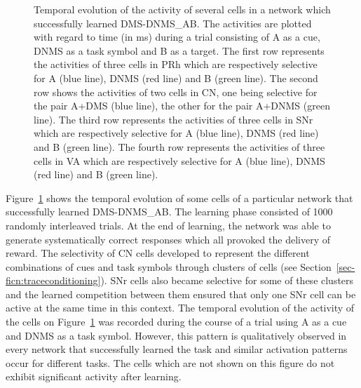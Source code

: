 \documentclass[
  11pt,
  a4paper,
]{scrbook}
\begin{document}
\begin{figure}


\caption{\label{fig-ficn:timecourse}Temporal evolution of the activity
of several cells in a network which successfully learned DMS-DNMS\_AB.
The activities are plotted with regard to time (in ms) during a trial
consisting of A as a cue, DNMS as a task symbol and B as a target. The
first row represents the activities of three cells in PRh which are
respectively selective for A (blue line), DNMS (red line) and B (green
line). The second row shows the activities of two cells in CN, one being
selective for the pair A+DMS (blue line), the other for the pair A+DNMS
(green line). The third row represents the activities of three cells in
SNr which are respectively selective for A (blue line), DNMS (red line)
and B (green line). The fourth row represents the activities of three
cells in VA which are respectively selective for A (blue line), DNMS
(red line) and B (green line).}

\end{figure}%

Figure~\ref{fig-ficn:timecourse} shows the temporal evolution of some
cells of a particular network that successfully learned DMS-DNMS\_AB.
The learning phase consisted of 1000 randomly interleaved trials. At the
end of learning, the network was able to generate systematically correct
responses which all provoked the delivery of reward. The selectivity of
CN cells developed to represent the different combinations of cues and
task symbols through clusters of cells (see
Section~\ref{sec-ficn:traceconditioning}). SNr cells also became
selective for some of these clusters and the learned competition between
them ensured that only one SNr cell can be active at the same time in
this context. The temporal evolution of the activity of the cells on
Figure~\ref{fig-ficn:timecourse} was recorded during the course of a
trial using A as a cue and DNMS as a task symbol. However, this pattern
is qualitatively observed in every network that successfully learned the
task and similar activation patterns occur for different tasks. The
cells which are not shown on this figure do not exhibit significant
activity after learning.
\end{document}
